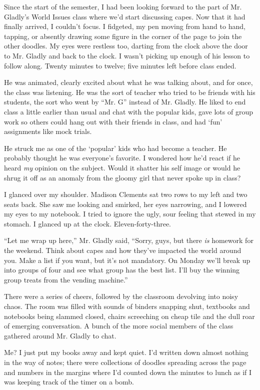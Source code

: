 Since the start of the semester, I had been looking forward to the part of Mr. Gladly's World Issues class where we'd start discussing capes. Now that it had finally arrived, I couldn't focus. I fidgeted, my pen moving from hand to hand, tapping, or absently drawing some figure in the corner of the page to join the other doodles. My eyes were restless too, darting from the clock above the door to Mr. Gladly and back to the clock. I wasn't picking up enough of his lesson to follow along. Twenty minutes to twelve; five minutes left before class ended.

He was animated, clearly excited about what he was talking about, and for once, the class was listening. He was the sort of teacher who tried to be friends with his students, the sort who went by ``Mr. G'' instead of Mr. Gladly. He liked to end class a little earlier than usual and chat with the popular kids, gave lots of group work so others could hang out with their friends in class, and had `fun' assignments like mock trials.

He struck me as one of the `popular' kids who had become a teacher. He probably thought he was everyone's favorite. I wondered how he'd react if he heard \emph{my} opinion on the subject. Would it shatter his self image or would he shrug it off as an anomaly from the gloomy girl that never spoke up in class?

I glanced over my shoulder. Madison Clements sat two rows to my left and two seats back. She saw me looking and smirked, her eyes narrowing, and I lowered my eyes to my notebook. I tried to ignore the ugly, sour feeling that stewed in my stomach. I glanced up at the clock. Eleven-forty-three.

``Let me wrap up here,'' Mr. Gladly said, ``Sorry, guys, but there \emph{is} homework for the weekend. Think about capes and how they've impacted the world around you. Make a list if you want, but it's not mandatory. On Monday we'll break up into groups of four and see what group has the best list. I'll buy the winning group treats from the vending machine.''

There were a series of cheers, followed by the classroom devolving into noisy chaos. The room was filled with sounds of binders snapping shut, textbooks and notebooks being slammed closed, chairs screeching on cheap tile and the dull roar of emerging conversation. A bunch of the more social members of the class gathered around Mr. Gladly to chat.

Me? I just put my books away and kept quiet. I'd written down almost nothing in the way of notes; there were collections of doodles spreading across the page and numbers in the margins where I'd counted down the minutes to lunch as if I was keeping track of the timer on a bomb.

